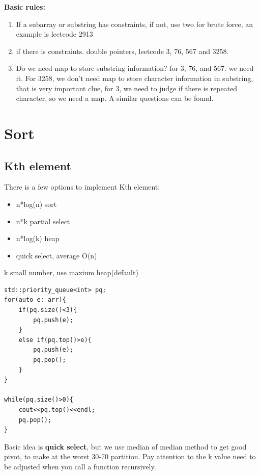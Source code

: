 \documentclass[a4paper,11pt,twoside]{book}
\begin{document}
	\par \textbf{Basic rules:}
\begin{enumerate}
	\item If a subarray or substring has constraints, if not, use two for brute force, an example is leetcode 2913
	
	\item if there is constraints. double pointers, leetcode 3, 76, 567 and 3258.
	
	\item Do we need map to store substring information?  for 3, 76, and 567. we need it. For 3258, we don't need map to store character information in substring, that is very important clue, for 3, we need to judge if there is repeated character, so we need a map. A similar questions can be found.
\end{enumerate}
	

	



\section{Sort}


\subsection{Kth element}

	\par There is a few options to implement Kth element:
	\begin{itemize}
		\item n*log(n) sort
		\item n*k partial select
		\item n*log(k) heap 
		\item quick select, average O(n)
	\end{itemize}

\par k small number, use maxium heap(default)
\begin{lstlisting}
std::priority_queue<int> pq;
for(auto e: arr){
	if(pq.size()<3){
		pq.push(e);
	}
	else if(pq.top()>e){
		pq.push(e);
		pq.pop();
	}
}

while(pq.size()>0){
	cout<<pq.top()<<endl;
	pq.pop();
}		
\end{lstlisting}

	\par Basic idea is \textbf{quick select}, but we use median of median method to get good pivot, to make at the worst 30-70 partition. Pay attention to the k value need to be adjusted when you call a function recursively. 
	
\end{document}
